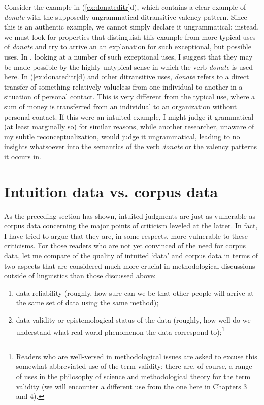 Consider the example in (\ref{ex:donateditr}d), which contains a clear example of \textit{donate} with the supposedly ungrammatical ditransitive valency pattern. Since this is an authentic example, we cannot simply declare it ungrammatical; instead, we must look for properties that distinguish this example from more typical uses of \textit{donate} and try to arrive an an explanation for such exceptional, but possible uses. In \citet{stefanowitsch_linguistics_2007}, looking at a number of such exceptional uses, I suggest that they may be made possible by the highly untypical sense in which the verb \textit{donate }is used here. In (\ref{ex:donateditr}d) and other ditransitive uses, \textit{donate} refers to a direct transfer of something relatively valueless from one individual to another in a situation of personal contact. This is very different from the typical use, where a sum of money is transferred from an individual to an organization without personal contact. If this were an intuited example, I might judge it grammatical (at least marginally so) for similar reasons, while another researcher, unaware of my subtle reconceptualization, would judge it ungrammatical, leading to no insights whatsoever into the semantics of the verb \textit{donate} or the valency patterns it occurs in.

\section{Intuition data vs. corpus data}
\label{sec:intuitiondatavscorpusdata}

As the preceding section has shown, intuited judgments are just as vulnerable as corpus data concerning the major points of criticism leveled at the latter. In fact, I have tried to argue that they are, in some respects, more vulnerable to these criticisms. For those readers who are not yet convinced of the need for corpus data, let me compare of the quality of intuited `data' and corpus data in terms of two aspects that are considered much more crucial in methodological discussions outside of linguistics than those discussed above:

\begin{enumerate}
\item data reliability (roughly, how sure can we be that other people will arrive at the same set of data using the same method);
\item data validity or epistemological status of the data (roughly, how well do we understand what real world phenomenon the data correspond to);\footnote{Readers who are well-versed in methodological issues are asked to excuse this somewhat abbreviated use of the term validity; there are, of course, a range of uses in the philosophy of science and methodological theory for the term validity (we will encounter a different use from the one here in Chapters 3 and 4).} 
\end{enumerate}

